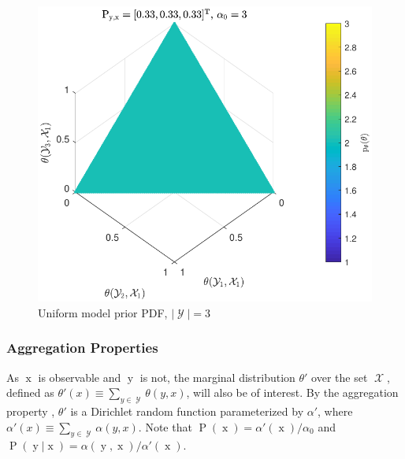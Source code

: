 \documentclass[12pt]{report}
\DeclareMathOperator{\xrm}{\mathrm{x}}
\DeclareMathOperator{\yrm}{\mathrm{y}}
\DeclareMathOperator{\Prm}{\mathrm{P}}
\DeclareMathOperator{\Xcal}{\mathcal{X}}
\DeclareMathOperator{\Ycal}{\mathcal{Y}}
\begin{document}
\begin{figure}
\centering
\includegraphics[scale=1.0]{P_theta_uniform.pdf}
\caption{Uniform model prior PDF, $|\Ycal| = 3$}
\label{fig:P_theta_uniform}
\end{figure}



\subsubsection{Aggregation Properties}

As $\xrm$ is observable and $\yrm$ is not, the marginal distribution $\theta'$ over the set $\Xcal$, defined as $\theta'(x) \equiv \sum_{y \in \Ycal} \theta(y,x)$, will also be of interest. By the aggregation property \cite{ferguson}, $\theta'$ is a Dirichlet random function parameterized by $\alpha'$, where $\alpha'(x) \equiv \sum_{y \in \Ycal} \alpha(y,x)$. Note that $\Prm(\xrm) = \alpha'(\xrm) / \alpha_0$ and $\Prm(\yrm|\xrm) = \alpha(\yrm,\xrm) / \alpha'(\xrm)$. 
\end{document}
